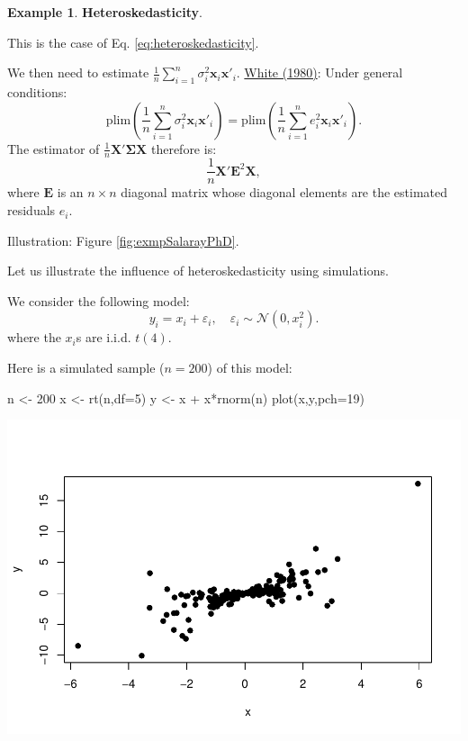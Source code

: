 \documentclass[
]{book}
\newenvironment{Shaded}{\begin{snugshade}}{\end{snugshade}}
\newcommand{\AttributeTok}[1]{\textcolor[rgb]{0.77,0.63,0.00}{#1}}
\newcommand{\DecValTok}[1]{\textcolor[rgb]{0.00,0.00,0.81}{#1}}
\newcommand{\FunctionTok}[1]{\textcolor[rgb]{0.00,0.00,0.00}{#1}}
\newcommand{\NormalTok}[1]{#1}
\newcommand{\OtherTok}[1]{\textcolor[rgb]{0.56,0.35,0.01}{#1}}
\newcommand{\SpecialCharTok}[1]{\textcolor[rgb]{0.00,0.00,0.00}{#1}}
\theoremstyle{definition}
\theoremstyle{definition}
\newtheorem{example}{Example}[chapter]
\theoremstyle{definition}
\theoremstyle{definition}
\theoremstyle{remark}
\begin{document}
\begin{example}
\protect\hypertarget{exm:heteroskedasticity}{}\label{exm:heteroskedasticity}\textbf{Heteroskedasticity}.

This is the case of Eq. \eqref{eq:heteroskedasticity}.

We then need to estimate \(\frac{1}{n}\sum_{i=1}^{n}\sigma_{i}^2\mathbf{x}_i\mathbf{x}'_i\). \href{http://www.jstor.org/stable/1912934}{White (1980)}: Under general conditions:
\begin{equation}
\mbox{plim}\left( \frac{1}{n}\sum_{i=1}^{n}\sigma_{i}^2\mathbf{x}_i\mathbf{x}'_i \right) = 
\mbox{plim}\left( \frac{1}{n}\sum_{i=1}^{n}e_{i}^2\mathbf{x}_i\mathbf{x}'_i \right). \label{eq:white}
\end{equation}
The estimator of \(\frac{1}{n}\mathbf{X}'\boldsymbol\Sigma\mathbf{X}\) therefore is:
\[
\frac{1}{n}\mathbf{X}'\mathbf{E}^2\mathbf{X},
\]
where \(\mathbf{E}\) is an \(n \times n\) diagonal matrix whose diagonal elements are the estimated residuals \(e_i\).

Illustration: Figure \ref{fig:exmpSalarayPhD}.
\end{example}

Let us illustrate the influence of heteroskedasticity using simulations.

We consider the following model:
\[
y_i = x_i + \varepsilon_i, \quad \varepsilon_i \sim \mathcal{N}(0,x_i^2).
\]
where the \(x_i\)s are i.i.d. \(t(4)\).

Here is a simulated sample (\(n=200\)) of this model:

\begin{Shaded}
\begin{Highlighting}[]
\NormalTok{n }\OtherTok{\textless{}{-}} \DecValTok{200}
\NormalTok{x }\OtherTok{\textless{}{-}} \FunctionTok{rt}\NormalTok{(n,}\AttributeTok{df=}\DecValTok{5}\NormalTok{)}
\NormalTok{y }\OtherTok{\textless{}{-}}\NormalTok{ x }\SpecialCharTok{+}\NormalTok{ x}\SpecialCharTok{*}\FunctionTok{rnorm}\NormalTok{(n)}
\FunctionTok{plot}\NormalTok{(x,y,}\AttributeTok{pch=}\DecValTok{19}\NormalTok{)}
\end{Highlighting}
\end{Shaded}

\includegraphics{bookdown-demo_files/figure-latex/simulHeterosk-1.pdf}
\end{document}
